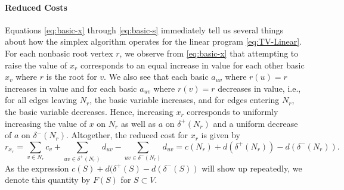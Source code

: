 \documentclass[titlepage,11pt]{article}
\begin{document}
\paragraph{Reduced Costs}
Equations \eqref{eq:basic-x} through \eqref{eq:basic-s} immediately tell us several things about how the simplex algorithm operates for the linear program \eqref{eq:TV-Linear}. For each nonbasic root vertex $r$, we observe from \eqref{eq:basic-x} that attempting to raise the value of $x_r$ corresponds to an equal increase in value for each other basic $x_v$ where $r$ is the root for $v$. We also see that each basic $a_{uv}$ where $r(u) = r$ increases in value and for each basic $a_{uv}$ where $r(v) = r$ decreases in value, i.e., for all edges leaving $N_r$, the basic variable increases, and for edges entering $N_r$, the basic variable decreases. 
Hence, increasing $x_r$ corresponds to uniformly increasing the value of $x$ on $N_r$ as well as $a$ on $\delta^+(N_r)$ and a uniform decrease of $a$ on $\delta^-(N_r)$.
Altogether, the reduced cost for $x_r$ is given by
\begin{equation}\label{eq:reduced-cost-vertex}
    r_{x_r} = \sum_{v \in N_r} c_v + \sum_{uv \in \delta^+(N_r)}d_{uv} - \sum_{uv \in \delta^-(N_r)}d_{uv} = c(N_r) + d(\delta^+(N_r)) - d(\delta^-(N_r)).
\end{equation}
As the expression $c(S) + d(\delta^+(S) - d(\delta^-(S))$ will show up repeatedly, we denote this quantity by $F(S)$ for $S \subset V$.
\end{document}
